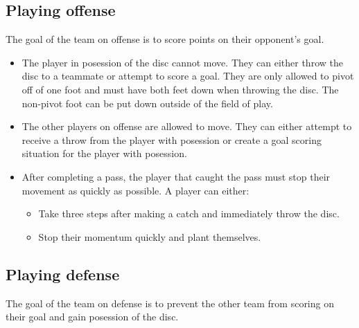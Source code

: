 \documentclass[10pt]{article}
\begin{document}
\subsection{Playing offense}

The goal of the team on offense is to score points on their opponent's goal.

\begin{itemize}
    \item The player in posession of the disc cannot move. They can either throw the disc to a teammate or attempt to score a goal. They are only allowed to pivot off of one foot and must have both feet down when throwing the disc. The non-pivot foot can be put down outside of the field of play.
    \item The other players on offense are allowed to move. They can either attempt to receive a throw from the player with posession or create a goal scoring situation for the player with posession.
    \item After completing a pass, the player that caught the pass must stop their movement as quickly as possible. A player can either:
    \begin{itemize}
        \item Take three steps after making a catch and immediately throw the disc.
        \item Stop their momentum quickly and plant themselves.
    \end{itemize}
\end{itemize}

\subsection{Playing defense}

The goal of the team on defense is to prevent the other team from scoring on their goal and gain posession of the disc.
\end{document}
